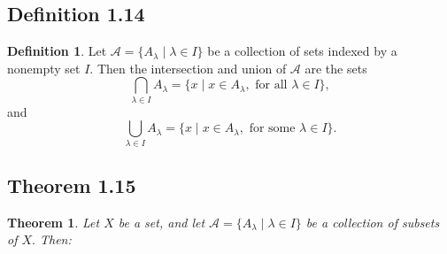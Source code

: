 \documentclass[openany, amssymb, psamsfonts]{amsart}
\newtheorem{thm}{Theorem}[section]
\theoremstyle{definition}
\newtheorem{defn}{Definition}[section]
\numberwithin{equation}{section}
\begin{document}
\subsection{Definition 1.14}
\begin{defn}

 Let $\mathcal{A}=\{A_\lambda\mid \lambda\in I\}$ be a collection of sets indexed by a nonempty set $I.$ Then the intersection and union of $\mathcal{A}$ are the sets
$$\bigcap_{\lambda\in I} A_\lambda =\{x\mid x\in A_\lambda, \text{ for all } \lambda\in I\},$$
and
$$\bigcup_{\lambda\in I}A_\lambda =\{x\mid x\in A_\lambda, \text{ for some }\lambda\in I\}.$$
\end{defn}
\subsection{Theorem 1.15}
\begin{thm}  
Let $X$ be a set, and let  $\mathcal{A}=\{A_\lambda\mid \lambda\in I\}$ be a collection of subsets of $X.$ Then:
\end{thm}
\end{document}
